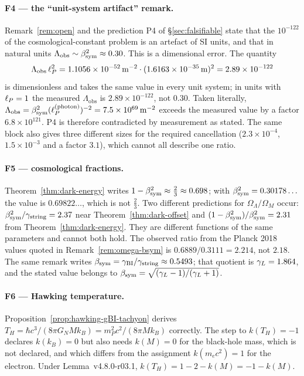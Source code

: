\paragraph{F4 --- the ``unit-system artifact'' remark.}
Remark~\ref{rem:open} and the prediction P4 of \S\ref{sec:falsifiable} state that the
\(10^{-122}\) of the cosmological-constant problem is an artefact of SI units, and that in
natural units \(\Lambda_{\mathrm{obs}}\sim\beta_{\mathrm{sym}}^2\approx0.30\).  This is a dimensional error.
The quantity
\[
\Lambda_{\mathrm{obs}}\,\ell_P^{2}=1.1056\times10^{-52}\,\mathrm{m}^{-2}\cdot(1.6163\times10^{-35}\,\mathrm{m})^{2}
=2.89\times10^{-122}
\]
is dimensionless and takes the same value in every unit system; in units with \(\ell_P=1\) the
measured \(\Lambda_{\mathrm{obs}}\) is \(2.89\times10^{-122}\), not \(0.30\).  Taken literally,
\(\Lambda_{\mathrm{obs}}=\beta_{\mathrm{sym}}^2(\ell_P^{(\mathrm{photon})})^{-2}=7.5\times10^{69}\,\mathrm{m}^{-2}\)
exceeds the measured value by a factor \(6.8\times10^{121}\).  P4 is therefore contradicted by
measurement as stated.  The same block also gives three different sizes for the required
cancellation (\(2.3\times10^{-4}\), \(1.5\times10^{-3}\) and a factor \(3.1\)), which cannot all
describe one ratio.

\paragraph{F5 --- cosmological fractions.}
Theorem~\ref{thm:dark-energy} writes \(1-\beta_{\mathrm{sym}}^2\approx\tfrac23\approx0.698\); with
\(\beta_{\mathrm{sym}}^2=0.30178\ldots\) the value is \(0.69822\ldots\), which is not \(\tfrac23\).  Two different
predictions for \(\Omega_\Lambda/\Omega_M\) occur: \(\beta_{\mathrm{sym}}^2/\gamma_{\mathrm{string}}=2.37\) near
Theorem~\ref{thm:dark-offset} and \((1-\beta_{\mathrm{sym}}^2)/\beta_{\mathrm{sym}}^2=2.31\) from
Theorem~\ref{thm:dark-energy}.  They are different functions of the same parameters and cannot
both hold.  The observed ratio from the Planck 2018 values quoted in
Remark~\ref{rem:omega-bsym} is \(0.6889/0.3111=2.214\), not \(2.18\).  The same remark writes
\(\beta_{\mathrm{sym}}=\gamma_{\mathrm{BI}}/\gamma_{\mathrm{string}}\approx0.5493\); that quotient is \(\gamma_L=1.864\), and the stated value
belongs to \(\beta_{\mathrm{sym}}=\sqrt{(\gamma_L-1)/(\gamma_L+1)}\).

\paragraph{F6 --- Hawking temperature.}
Proposition~\ref{prop:hawking-gBI-tachyon} derives
\(T_H=\hbar c^3/(8\pi G_NMk_B)=m_P^2c^2/(8\pi Mk_B)\) correctly.  The step to
\(k(T_H)=-1\) declares \(k(k_B)=0\) but also needs \(k(M)=0\) for the black-hole mass, which is
not declared, and which differs from the assignment \(k(m_ec^2)=1\) for the electron.  Under
Lemma~v4.8.0-r03.1, \(k(T_H)=1-2-k(M)=-1-k(M)\).

